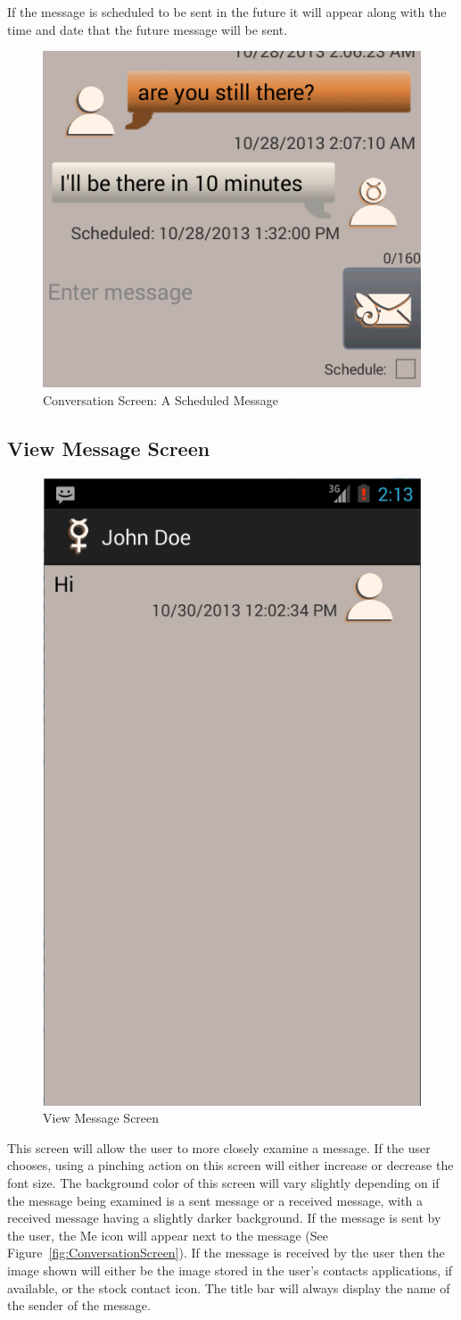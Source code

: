 \documentclass{article}
\begin{document}
\par If the message is scheduled to be sent in the future it will appear along with the time and date that the future message will be sent.

\begin{figure}[h!]
\centering
\includegraphics[width=.25\textwidth]{"./Screen_shots/Conversation_scheduled_message"}{}
\caption{Conversation Screen: A Scheduled Message}
\label{fig:ConversationScheduled}
\end{figure}

\pagebreak
\subsection{View Message Screen}
\label{sec:ViewMessage}


\begin{figure}[ht!]
\centering
\includegraphics[width=.25\textwidth]{"./Screen_shots/View_Individual_message"}{}
\caption{View Message Screen}
\label{fig:ViewMsg}
\end{figure}

\par This screen will allow the user to more closely examine a message. If the user chooses, using a pinching action on this screen will either increase or decrease the font size.
The background color of this screen will vary slightly depending on if the message being examined is a sent message or a received message, with a received message having a slightly darker background.
If the message is sent by the user, the Me icon will appear next to the message (See Figure~\ref{fig:ConversationScreen}).
If the message is received by the user then the image shown will either be the image stored in the user's contacts applications, if available, or the stock contact icon.
The title bar will always display the name of the sender of the message.
\end{document}
